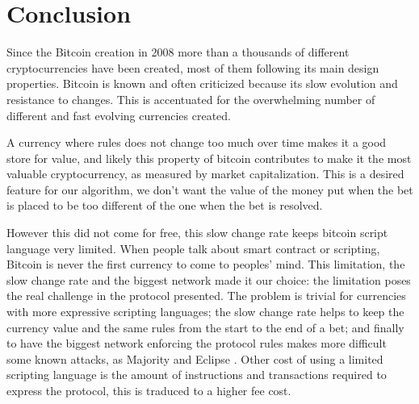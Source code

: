 \section{Conclusion}

Since the Bitcoin creation in 2008 more than a thousands of different
  cryptocurrencies have been created, most of them following its main design
  properties.
Bitcoin is known and often criticized because its slow evolution and resistance
  to changes.
This is accentuated for the overwhelming number of different and fast evolving
  currencies created.

A currency where rules does not change too much over time makes it a good store
  for value, and likely this property of bitcoin contributes to make it the
  most valuable cryptocurrency, as measured by market capitalization.
This is a desired feature for our algorithm, we don't want the value of the
  money put when the bet is placed to be too different of the one when the bet
  is resolved.

However this did not come for free, this slow change rate keeps bitcoin script
  language very limited.
When people talk about smart contract or scripting, Bitcoin is never the first
  currency to come to peoples' mind.
This limitation, the slow change rate and the biggest network made it our
  choice: the limitation poses the real challenge in the protocol presented.
The problem is trivial for currencies with more expressive scripting languages;
  the slow change rate helps to keep the currency value and the same rules from
  the start to the end of a bet; and finally to have the biggest network
  enforcing the protocol rules makes more difficult some known attacks, as
  Majority and Eclipse \cite{heilman2015eclipse}.
Other cost of using a limited scripting language is the amount of instructions
  and transactions required to express the protocol, this is traduced to a
  higher fee cost.



